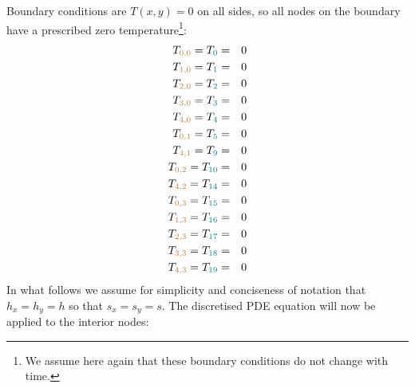 Boundary conditions are $T(x,y)=0$ on all sides, so all nodes 
on the boundary have a prescribed zero temperature\footnote{We assume
here again that these boundary conditions do not change with time.}:
\begin{eqnarray}
T_{\color{brown}0,0} = T_{\color{teal} 0} &=& 0 \nonumber\\
T_{\color{brown}1,0} = T_{\color{teal} 1} &=& 0 \nonumber\\
T_{\color{brown}2,0} = T_{\color{teal} 2} &=& 0 \nonumber\\
T_{\color{brown}3,0} = T_{\color{teal} 3} &=& 0 \nonumber\\
T_{\color{brown}4,0} = T_{\color{teal} 4} &=& 0 \nonumber\\
T_{\color{brown}0,1} = T_{\color{teal} 5} &=& 0 \nonumber\\
T_{\color{brown}4,1} = T_{\color{teal} 9} &=& 0 \nonumber\\
T_{\color{brown}0,2} = T_{\color{teal} 10} &=& 0 \nonumber\\
T_{\color{brown}4,2} = T_{\color{teal} 14} &=& 0 \nonumber\\
T_{\color{brown}0,3} = T_{\color{teal} 15} &=& 0 \nonumber\\
T_{\color{brown}1,3} = T_{\color{teal} 16} &=& 0 \nonumber\\
T_{\color{brown}2,3} = T_{\color{teal} 17} &=& 0 \nonumber\\
T_{\color{brown}3,3} = T_{\color{teal} 18} &=& 0 \nonumber\\
T_{\color{brown}4,3} = T_{\color{teal} 19} &=& 0 \nonumber
\end{eqnarray}
In what follows we assume for simplicity and conciseness of notation that 
$h_x=h_y=h$ so that $s_x=s_y=s$.
The discretised PDE equation will now be applied to the interior nodes:

